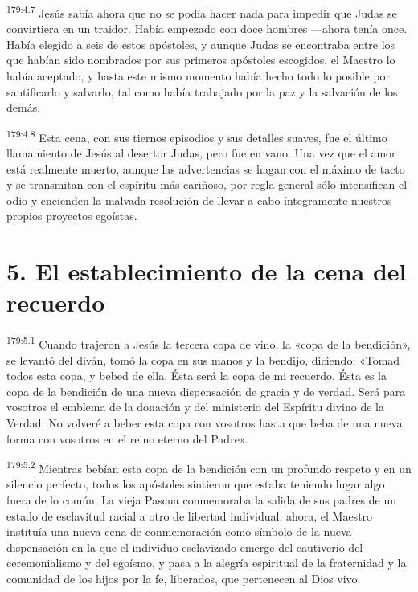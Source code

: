\par 
\textsuperscript{179:4.7} Jesús sabía ahora que no se podía hacer nada para impedir que Judas se convirtiera en un traidor. Había empezado con doce hombres ---ahora tenía once. Había elegido a seis de estos apóstoles, y aunque Judas se encontraba entre los que habían sido nombrados por sus primeros apóstoles escogidos, el Maestro lo había aceptado, y hasta este mismo momento había hecho todo lo posible por santificarlo y salvarlo, tal como había trabajado por la paz y la salvación de los demás.

\par 
\textsuperscript{179:4.8} Esta cena, con sus tiernos episodios y sus detalles suaves, fue el último llamamiento de Jesús al desertor Judas, pero fue en vano. Una vez que el amor está realmente muerto, aunque las advertencias se hagan con el máximo de tacto y se transmitan con el espíritu más cariñoso, por regla general sólo intensifican el odio y encienden la malvada resolución de llevar a cabo íntegramente nuestros propios proyectos egoístas.

\section*{5. El establecimiento de la cena del recuerdo}
\par 
\textsuperscript{179:5.1} Cuando trajeron a Jesús la tercera copa de vino, la «copa de la bendición», se levantó del diván, tomó la copa en sus manos y la bendijo, diciendo: «Tomad todos esta copa, y bebed de ella. Ésta será la copa de mi recuerdo. Ésta es la copa de la bendición de una nueva dispensación de gracia y de verdad. Será para vosotros el emblema de la donación y del ministerio del Espíritu divino de la Verdad. No volveré a beber esta copa con vosotros hasta que beba de una nueva forma con vosotros en el reino eterno del Padre».

\par 
\textsuperscript{179:5.2} Mientras bebían esta copa de la bendición con un profundo respeto y en un silencio perfecto, todos los apóstoles sintieron que estaba teniendo lugar algo fuera de lo común. La vieja Pascua conmemoraba la salida de sus padres de un estado de esclavitud racial a otro de libertad individual; ahora, el Maestro instituía una nueva cena de conmemoración como símbolo de la nueva dispensación en la que el individuo esclavizado emerge del cautiverio del ceremonialismo y del egoísmo, y pasa a la alegría espiritual de la fraternidad y la comunidad de los hijos por la fe, liberados, que pertenecen al Dios vivo.

